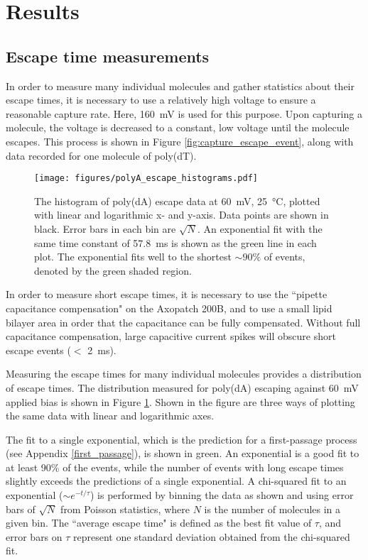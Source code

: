 \section{Results}

\subsection{Escape time measurements}

In order to measure many individual molecules and gather statistics about their escape times, it is necessary to use a relatively high voltage to ensure a reasonable capture rate.  Here, \SI{160}{\mV} is used for this purpose.  Upon capturing a molecule, the voltage is decreased to a constant, low voltage until the molecule escapes.  This process is shown in Figure \ref{fig:capture_escape_event}, along with data recorded for one molecule of poly(dT).

\begin{figure}[!h]
\begin{centering}
\texttt{[image: figures/polyA\_escape\_histograms.pdf]}
\caption[Measured escape times of poly(dA) ssDNA from MspA]{The histogram of poly(dA) escape data at \SI{60}{\mV}, \SI{25}{\celsius}, plotted with linear and logarithmic x- and y-axis.  Data points are shown in black.  Error bars in each bin are $\sqrt{N}$.  An exponential fit with the same time constant of \SI{57.8}{\ms} is shown as the green line in each plot.  The exponential fits well to the shortest $\sim 90\%$ of events, denoted by the green shaded region.}
\label{fig:polyA_escape_times}
\end{centering}
\end{figure}

In order to measure short escape times, it is necessary to use the ``pipette capacitance compensation" on the Axopatch 200B, and to use a small lipid bilayer area in order that the capacitance can be fully compensated.  Without full capacitance compensation, large capacitive current spikes will obscure short escape events ($<$ \SI{2}{\ms}).

Measuring the escape times for many individual molecules provides a distribution of escape times.  The distribution measured for poly(dA) escaping against \SI{60}{\mV} applied bias is shown in Figure \ref{fig:polyA_escape_times}.  Shown in the figure are three ways of plotting the same data with linear and logarithmic axes.

The fit to a single exponential, which is the prediction for a first-passage process (see Appendix \ref{first_passage}), is shown in green.  An exponential is a good fit to at least 90\% of the events, while the number of events with long escape times slightly exceeds the predictions of a single exponential.  A chi-squared fit to an exponential ($\sim e^{-t/\tau}$) is performed by binning the data as shown and using error bars of $\sqrt{N}$ from Poisson statistics, where $N$ is the number of molecules in a given bin.  The ``average escape time" is defined as the best fit value of $\tau$, and error bars on $\tau$ represent one standard deviation obtained from the chi-squared fit.

